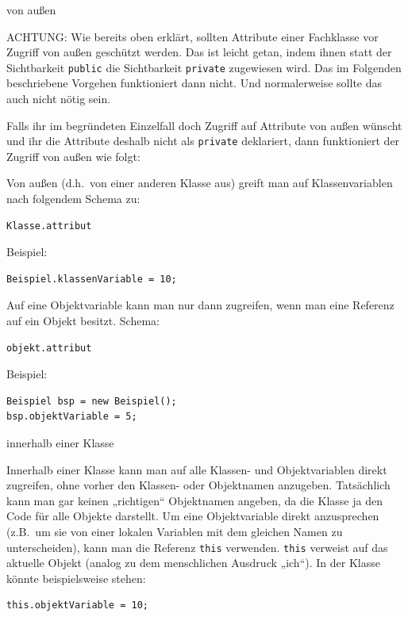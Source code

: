 \begin{compactenum}[a)]
\item von außen

ACHTUNG: Wie bereits oben erklärt, sollten Attribute einer Fachklasse vor Zugriff
von außen geschützt werden. Das ist leicht getan, indem ihnen statt der Sichtbarkeit
\lstinline|public| die Sichtbarkeit \lstinline|private| zugewiesen wird. Das im
Folgenden beschriebene Vorgehen funktioniert dann nicht. Und normalerweise sollte
das auch nicht nötig sein.

Falls ihr im begründeten Einzelfall doch Zugriff auf Attribute von außen wünscht und
ihr die Attribute deshalb nicht als \lstinline|private| deklariert, dann funktioniert
der Zugriff von außen wie folgt:

Von außen (d.h.\ von einer anderen Klasse aus) greift man auf Klassenvariablen
nach folgendem Schema zu:

\begin{lstlisting}
Klasse.attribut
\end{lstlisting}

Beispiel:

\begin{lstlisting}
Beispiel.klassenVariable = 10;
\end{lstlisting}

Auf eine Objektvariable kann man nur dann zugreifen, wenn man eine Referenz auf ein Objekt
besitzt. Schema:

\begin{lstlisting}
objekt.attribut
\end{lstlisting}

Beispiel:

\begin{lstlisting}
Beispiel bsp = new Beispiel();
bsp.objektVariable = 5;
\end{lstlisting}

\item innerhalb einer Klasse

Innerhalb einer Klasse kann man auf alle Klassen- und Objektvariablen direkt
zugreifen, ohne vorher den Klassen- oder Objektnamen anzugeben. Tatsächlich kann
man gar keinen „richtigen“ Objektnamen angeben, da die Klasse ja den Code für
alle Objekte darstellt. Um eine Objektvariable direkt anzusprechen (z.B.\ um sie
von einer lokalen Variablen mit dem gleichen Namen zu unterscheiden), kann man
die Referenz \lstinline|this| verwenden. \lstinline|this| verweist auf das aktuelle
Objekt (analog zu dem menschlichen Ausdruck „ich“). In der Klasse 
könnte beispielsweise stehen:

\begin{lstlisting}
this.objektVariable = 10;
\end{lstlisting}
\end{compactenum}


